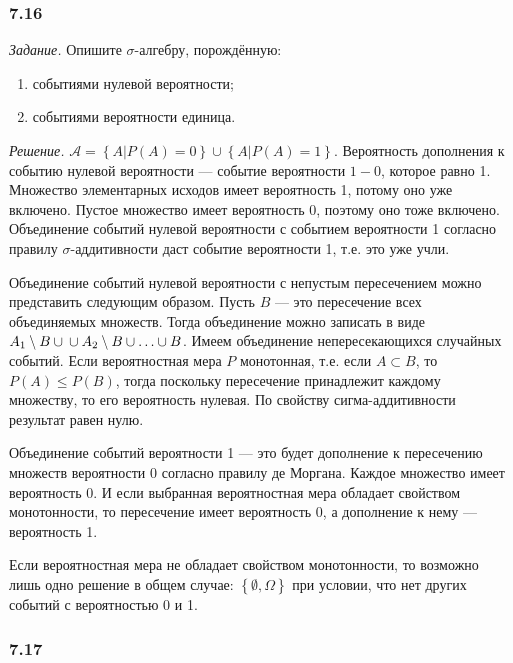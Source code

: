 \subsubsection*{7.16}

\textit{Задание.} Опишите $ \sigma $-алгебру, порождённую:
\begin{enumerate}[label=\alph*)]
\item событиями нулевой вероятности;
\item событиями вероятности единица.
\end{enumerate}

\textit{Решение.} $ \mathcal{A} = \left\{ \left. A \right| P \left( A \right) = 0 \right\} \cup \left\{ \left. A \right| P \left( A \right) = 1 \right\} $.
Вероятность дополнения к событию нулевой вероятности --- событие вероятности $1 - 0$, которое равно 1.
Множество элементарных исходов имеет вероятность 1, потому оно уже включено.
Пустое множество имеет вероятность 0, поэтому оно тоже включено.
Объединение событий нулевой вероятности с событием вероятности 1 согласно правилу $ \sigma $-аддитивности даст событие вероятности 1, т.е. это уже учли.

Объединение событий нулевой вероятности с непустым пересечением можно представить следующим образом.
Пусть $B$ --- это пересечение всех объединяемых множеств.
Тогда объединение можно записать в виде $A_1 \setminus B \cup \\
\cup A_2 \setminus B \cup \dotsc \cup B$.
Имеем объединение непересекающихся случайных событий.
Если вероятностная мера $P$ монотонная,
т.е. если $A \subset B$, то $P \left( A \right) \leq P \left( B \right) $, тогда поскольку пересечение принадлежит каждому множеству, то его вероятность нулевая.
По свойству сигма-аддитивности результат равен нулю.

Объединение событий вероятности 1 --- это будет дополнение к пересечению множеств вероятности 0 согласно правилу де Моргана.
Каждое множество имеет вероятность 0.
И если выбранная вероятностная мера обладает свойством монотонности, то пересечение имеет вероятность 0, а дополнение к нему --- вероятность 1.

Если вероятностная мера не обладает свойством монотонности, то возможно лишь одно решение в общем случае:
$ \left\{ \emptyset, \Omega \right\} $ при условии, что нет других событий с вероятностью 0 и 1.

\subsubsection*{7.17}

